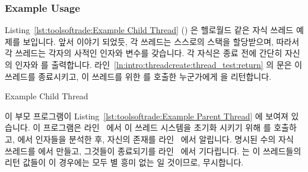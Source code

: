 \subsubsection{Example Usage}

Listing~\ref{lst:toolsoftrade:Example Child Thread} ()
은 헬로월드 같은 자식 쓰레드 예제를 보입니다.
앞서 이야기 되었듯, 각 쓰레드는 스스로의 스택을 할당받으며, 따라서 각 쓰레드는
각자의 사적인  인자와  변수를 갖습니다.
각 자식은 종료 전에 간단히 자신의 인자와  를 출력합니다.
라인~\ref{ln:intro:threadcreate:thread_test:return} 의  문은 이
쓰레드를 종료시키고, 이 쓰레드를 위한  를 호출한
누군가에게  을 리턴합니다.

\begin{listing}[tbp]

\caption{Example Child Thread}
\label{lst:toolsoftrade:Example Child Thread}
\end{listing}

\begin{fcvref}
이 부모 프로그램이
Listing~\ref{lst:toolsoftrade:Example Parent Thread}
에 보여져 있습니다.
이 프로그램은 라인~ 에서 이 쓰레드 시스템을 초기화 시키기 위해
 를 호출하고,  에서 인자들을
분석한 후, 자신의 존재를 라인~ 에서 알립니다.
명시된 수의 자식 쓰레드를
 에서 만들고, 그것들이 종료되기를
라인~ 에서 기다립니다.
 는 이 쓰레드들의 리턴 값들이 이 경우에는 모두 별
흥미 없는  일 것이므로, 무시합니다.
\end{fcvref}

